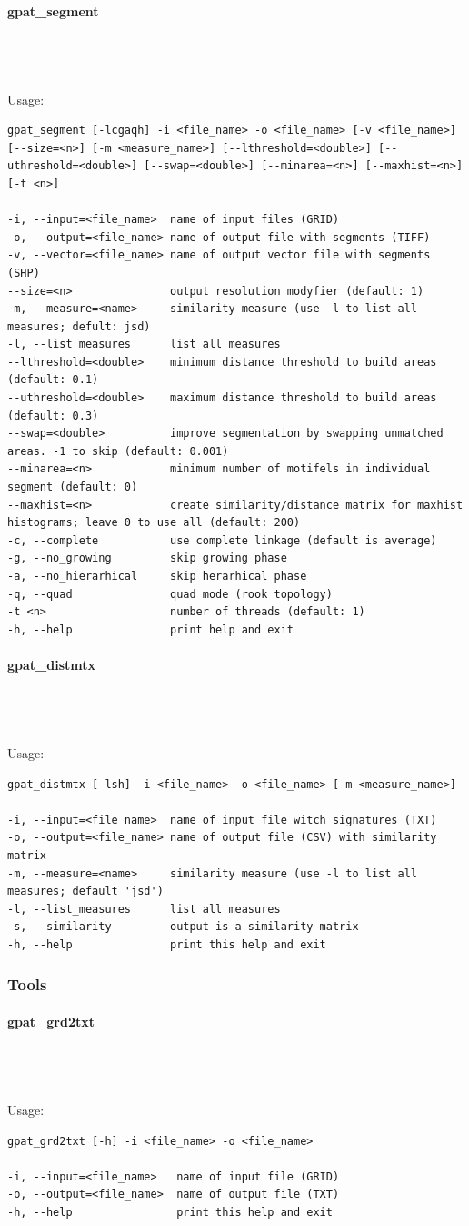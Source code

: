 \documentclass[12pt,margin=0.5in]{article}
\newcommand{\newparagraph}[1]{\paragraph{#1}\mbox{}\\}
\begin{document}
\newparagraph{gpat\_segment}
{}
\\\\
Usage:
\begin{lstlisting}[frame=single]
gpat_segment [-lcgaqh] -i <file_name> -o <file_name> [-v <file_name>] [--size=<n>] [-m <measure_name>] [--lthreshold=<double>] [--uthreshold=<double>] [--swap=<double>] [--minarea=<n>] [--maxhist=<n>] [-t <n>]

-i, --input=<file_name>  name of input files (GRID)
-o, --output=<file_name> name of output file with segments (TIFF)
-v, --vector=<file_name> name of output vector file with segments (SHP)
--size=<n>               output resolution modyfier (default: 1)
-m, --measure=<name>     similarity measure (use -l to list all measures; defult: jsd)
-l, --list_measures      list all measures
--lthreshold=<double>    minimum distance threshold to build areas (default: 0.1)
--uthreshold=<double>    maximum distance threshold to build areas (default: 0.3)
--swap=<double>          improve segmentation by swapping unmatched areas. -1 to skip (default: 0.001)
--minarea=<n>            minimum number of motifels in individual segment (default: 0)
--maxhist=<n>            create similarity/distance matrix for maxhist histograms; leave 0 to use all (default: 200)
-c, --complete           use complete linkage (default is average)
-g, --no_growing         skip growing phase
-a, --no_hierarhical     skip herarhical phase
-q, --quad               quad mode (rook topology)
-t <n>                   number of threads (default: 1)
-h, --help               print help and exit
\end{lstlisting}

\newparagraph{gpat\_distmtx}
{}
\\\\
Usage:
\begin{lstlisting}[frame=single]
gpat_distmtx [-lsh] -i <file_name> -o <file_name> [-m <measure_name>]

-i, --input=<file_name>  name of input file witch signatures (TXT)
-o, --output=<file_name> name of output file (CSV) with similarity matrix
-m, --measure=<name>     similarity measure (use -l to list all measures; default 'jsd')
-l, --list_measures      list all measures
-s, --similarity         output is a similarity matrix
-h, --help               print this help and exit
\end{lstlisting}

\subsubsection{Tools}
\newparagraph{gpat\_grd2txt}
{}
\\\\
Usage:
\begin{lstlisting}[frame=single]
gpat_grd2txt [-h] -i <file_name> -o <file_name>

-i, --input=<file_name>   name of input file (GRID)
-o, --output=<file_name>  name of output file (TXT)
-h, --help                print this help and exit
\end{lstlisting}
\end{document}
